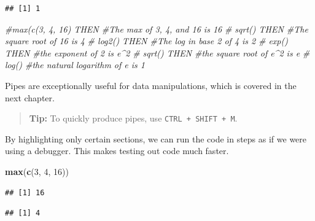 \documentclass[openany]{book}
\newenvironment{Shaded}{\begin{snugshade}}{\end{snugshade}}
\newcommand{\CommentTok}[1]{\textcolor[rgb]{0.56,0.35,0.01}{\textit{#1}}}
\newcommand{\DecValTok}[1]{\textcolor[rgb]{0.00,0.00,0.81}{#1}}
\newcommand{\KeywordTok}[1]{\textcolor[rgb]{0.13,0.29,0.53}{\textbf{#1}}}
\newcommand{\NormalTok}[1]{#1}
\newcommand{\OperatorTok}[1]{\textcolor[rgb]{0.81,0.36,0.00}{\textbf{#1}}}
\newcommand{\StringTok}[1]{\textcolor[rgb]{0.31,0.60,0.02}{#1}}
\begin{document}
\begin{verbatim}
## [1] 1
\end{verbatim}

\begin{Shaded}
\begin{Highlighting}[]
\CommentTok{#max(c(3, 4, 16) THEN   #The max of 3, 4, and 16 is 16}
\CommentTok{#  sqrt() THEN          #The square root of 16 is 4}
\CommentTok{#  log2() THEN          #The log in base 2 of 4 is 2}
\CommentTok{#  exp() THEN           #the exponent of 2 is e^2}
\CommentTok{#  sqrt() THEN          #the square root of e^2 is e}
\CommentTok{#  log()                #the natural logarithm of e is 1}
\end{Highlighting}
\end{Shaded}

Pipes are exceptionally useful for data manipulations, which is covered in the next chapter.

\begin{quote}
\textbf{Tip:} To quickly produce pipes, use \texttt{CTRL\ +\ SHIFT\ +\ M}.
\end{quote}

By highlighting only certain sections, we can run the code in steps as if we were using a debugger. This makes testing out code much faster.

\begin{Shaded}
\begin{Highlighting}[]
\KeywordTok{max}\NormalTok{(}\KeywordTok{c}\NormalTok{(}\DecValTok{3}\NormalTok{, }\DecValTok{4}\NormalTok{, }\DecValTok{16}\NormalTok{))}
\end{Highlighting}
\end{Shaded}

\begin{verbatim}
## [1] 16
\end{verbatim}

\begin{Shaded}
\end{Shaded}

\begin{verbatim}
## [1] 4
\end{verbatim}

\begin{Shaded}
\end{Shaded}
\end{document}

